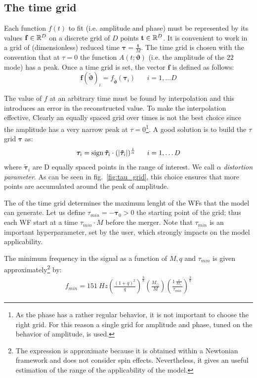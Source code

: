 \subsection{The time grid}
Each function $f(t)$ to fit (i.e. amplitude and phase) must be represented by its values $\mathbf{f} \in \mathbb{R}^D$ on a discrete grid of $D$ points $\mathbf{t} \in \mathbb{R}^D$.
It is convenient to work in a grid of (dimensionless) reduced time $\boldsymbol{\tau} = \frac{\mathbf{t}}{M}$.
The time grid is chosen with the convention that at $\tau=0$ the function $A(t;\boldsymbol{\vartheta})$ (i.e. the amplitude of the ${22}$ mode) has a peak.
Once a time grid is set, the vector $\mathbf{f}$ is defined as follows:
\begin{equation}
	\mathbf{f}({\tilde{\boldsymbol{\vartheta}}})_i = f_{{\tilde{\boldsymbol{\vartheta}}}}(\boldsymbol{\tau}_i) \;\;\;\;\;\; i = 1, \ldots D
\end{equation}
\par
The value of $f$ at an arbitrary time must be found by interpolation and this introduces an error in the reconstructed value.
To make the interpolation effective, 
Clearly an equally spaced grid over times is not the best choice since the amplitude has a very narrow peak at $\tau=0$\footnote{As the phase has a rather regular behavior, it is not important to choose the right grid. For this reason a single grid for amplitude and phase, tuned on the behavior of amplitude, is used.}.
A good solution is to build the $\tau$ grid ${\boldsymbol{\tau}}$ as:
\begin{equation} \label{eq:tau_grid}
	{\boldsymbol{\tau}}_i = \operatorname{sign}{\boldsymbol{\tilde{\tau}}_i} \cdot (|\boldsymbol{\tilde{\tau}}_i|)^{\frac{1}{\alpha}} \;\;\;\;\;\; i = 1, \ldots D
\end{equation}
where $\boldsymbol{\tilde{\tau}}_i$ are D equally spaced points in the range of interest.
We call $\alpha$ \textit{distortion parameter}.
As can be seen in fig.~\ref{fig:tau_grid}, this choice ensures that more points are accumulated around the peak of amplitude.
\par
The  of the time grid determines the maximum lenght of the WFs that the model can generate.
Let us define $\tau_{min} = -{\boldsymbol{\tau}}_0 > 0 $ the starting point of the grid; thus each WF start at a time $\tau_{min}\cdot M$ before the merger.
Note that $\tau_{min}$ is an important hyperparameter, set by the user, which strongly impacts on the model applicability.
\par
The minimum frequency in the signal as a function of $M, q$ and $\tau_{min}$ is given approximately\footnote{The expression is approximate because it is obtained within a Newtonian framework and does not consider spin effects.
Nevertheless, it gives an useful estimation of the range of the applicability of the model.}
by:
\begin{align}\label{eq:f_min}
	f_{min} = \SI{151}{Hz}  \left( \frac{(1+q)^2}{q} \right)^{\frac{3}{8}}  \left( \frac{M_\odot}{M} \right)  \left(\frac{\SI{1}{ \frac{s}{M_\odot}}}{\tau_{min}} \right)^{\frac{3}{8}}  
\end{align} 


